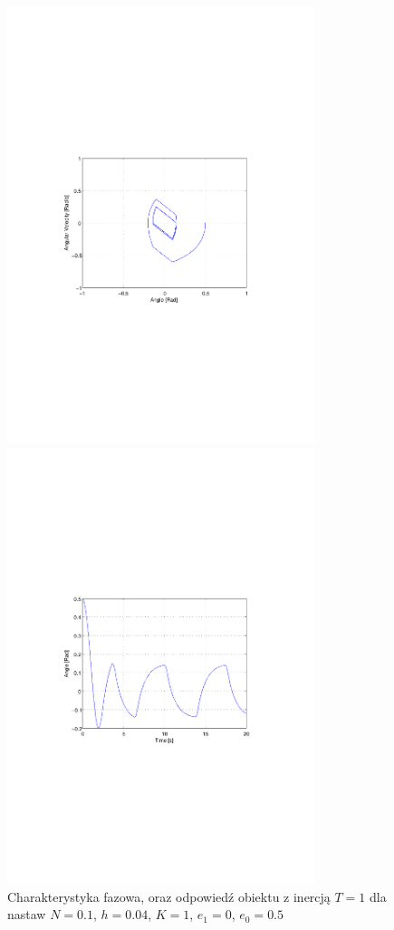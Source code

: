 \documentclass[12pt]{article}
\begin{document}
\newpage

\begin{figure}[!htb]
	\begin{center}
		\includegraphics[trim=5cm 9cm 5cm
		9cm,width=9cm]{../res/img/s1_T1_N0,1_h0,04_K1_e1-0_e0-0,5p.pdf}
	\end{center}
	
	\begin{center}
		\includegraphics[trim=5cm 9cm 5cm
		9cm,width=9cm]{../res/img/s1_T1_N0,1_h0,04_K1_e1-0_e0-0,5r.pdf}
	\end{center}
	\caption{Charakterystyka fazowa, oraz odpowiedź obiektu z inercją $T=1$ dla
	nastaw $N=0.1$, $h=0.04$, $K=1$, $e_1=0$, $e_0=0.5$}
\end{figure}
\end{document}
